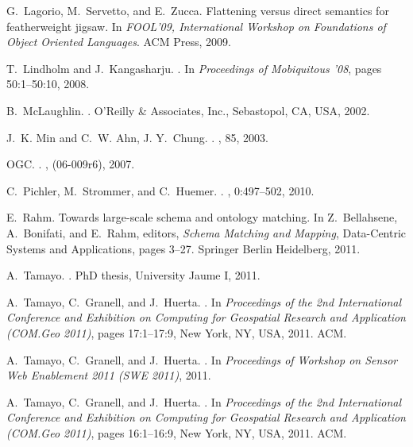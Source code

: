 \documentclass{sig-alternate}
\begin{document}
\begin{thebibliography}{10}
G.~Lagorio, M.~Servetto, and E.~Zucca.
\newblock Flattening versus direct semantics for featherweight jigsaw.
\newblock In {\em FOOL'09, International Workshop on Foundations of Object
  Oriented Languages}. ACM Press, 2009.

T.~Lindholm and J.~Kangasharju.
.
\newblock In {\em Proceedings of Mobiquitous '08}, pages 50:1--50:10, 2008.

B.~McLaughlin.
.
\newblock O'Reilly \& Associates, Inc., Sebastopol, CA, USA, 2002.

J.~K. Min and C.~W. Ahn, J. Y.~Chung.
.
, 85, 2003.

OGC.
.
, (06-009r6), 2007.

C.~Pichler, M.~Strommer, and C.~Huemer.
.
, 0:497--502, 2010.

E.~Rahm.
\newblock Towards large-scale schema and ontology matching.
\newblock In Z.~Bellahsene, A.~Bonifati, and E.~Rahm, editors, {\em Schema
  Matching and Mapping}, Data-Centric Systems and Applications, pages 3--27.
  Springer Berlin Heidelberg, 2011.

A.~Tamayo.
.
\newblock PhD thesis, University Jaume I, 2011.

A.~Tamayo, C.~Granell, and J.~Huerta.
.
\newblock In {\em Proceedings of the 2nd International Conference and
  Exhibition on Computing for Geospatial Research and Application (COM.Geo
  2011)}, pages 17:1--17:9, New York, NY, USA, 2011. ACM.

A.~Tamayo, C.~Granell, and J.~Huerta.
.
\newblock In {\em Proceedings of Workshop on Sensor Web Enablement 2011 (SWE
  2011)}, 2011.

A.~Tamayo, C.~Granell, and J.~Huerta.
.
\newblock In {\em Proceedings of the 2nd International Conference and
  Exhibition on Computing for Geospatial Research and Application (COM.Geo
  2011)}, pages 16:1--16:9, New York, NY, USA, 2011. ACM.
  

\end{thebibliography}
\end{document}
